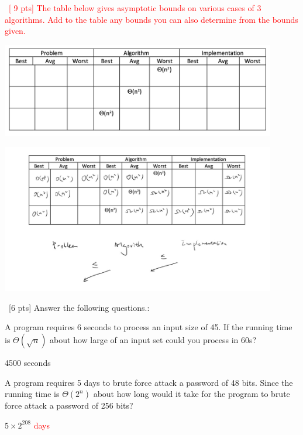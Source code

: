 \documentclass[12pt]{article}
\newenvironment{sol}[1][Solution]{\begin{trivlist}\item[\hskip\labelsep {\bfseries #1:}]}{\end{trivlist}}
\begin{document}
\begin{enumerate}
\begin{enumerate}
    \end{enumerate}
    \item \ \textcolor{red}{[ 9 pts] The table below gives asymptotic bounds on various cases of 3 algorithms. Add to the table any bounds you can also determine from the bounds given.}
    \begin{center}
            \includegraphics[width = 0.9\textwidth]{p4.png}
    \end{center}
    \begin{sol}
            \begin{center}
            \includegraphics[width = 0.9\textwidth]{p5.jpg}
    \end{center}
    \end{sol}

    \item \ [6 pts] Answer the following questions.:
    \begin{enumerate}
        \item A program requires 6 seconds to process an input size of 45. If the running time is $\Theta(\sqrt{n})$ about how large of an input set could you process in 60s?
        \begin{sol}
            4500 seconds
        \end{sol}

        \item A program requires 5 days to brute force attack a password of 48 bits. Since the running time is $\Theta(2^n)$ about how long would it take for the program to brute force attack a password of 256 bits?
        \begin{sol}
            $5\times 2^{208} $ \textcolor{red}{days}
        \end{sol}


\end{enumerate}
\end{enumerate}
\end{document}
